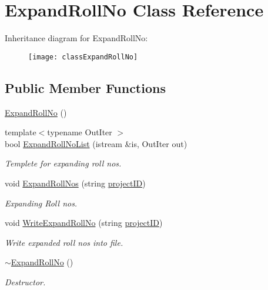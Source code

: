 \hypertarget{classExpandRollNo}{\section{\-Expand\-Roll\-No \-Class \-Reference}
\label{classExpandRollNo}
}
\-Inheritance diagram for \-Expand\-Roll\-No\-:\begin{figure}[H]
\begin{center}
\leavevmode
\texttt{[image: classExpandRollNo]}
\end{center}
\end{figure}
\subsection*{\-Public \-Member \-Functions}
\begin{DoxyCompactItemize}
\item 
\hyperlink{classExpandRollNo_a60e3a3d50ebe826b6d5c3304757812ca}{\-Expand\-Roll\-No} ()
\item 
{\footnotesize template$<$typename Out\-Iter $>$ }\\bool \hyperlink{classExpandRollNo_afcb476d9d9f1fdabd456f3ec84b14184}{\-Expand\-Roll\-No\-List} (istream \&is, \-Out\-Iter out)
\begin{DoxyCompactList}\small\item\em \-Templete for expanding roll nos. \end{DoxyCompactList}\item 
void \hyperlink{classExpandRollNo_a4917831a98da9aa068b2589945b46065}{\-Expand\-Roll\-Nos} (string \hyperlink{classReadInput_a3ad470a25b3e0a29466bf4ff1f7d8e81}{project\-I\-D})
\begin{DoxyCompactList}\small\item\em \-Expanding \-Roll nos. \end{DoxyCompactList}\item 
void \hyperlink{classExpandRollNo_af95bc4c35354c225bdfff5fae7f6b845}{\-Write\-Expand\-Roll\-No} (string \hyperlink{classReadInput_a3ad470a25b3e0a29466bf4ff1f7d8e81}{project\-I\-D})
\begin{DoxyCompactList}\small\item\em \-Write expanded roll nos into file. \end{DoxyCompactList}\item 
\hyperlink{classExpandRollNo_acf3cb7b789bd49a79672cb93dac2ed7c}{$\sim$\-Expand\-Roll\-No} ()
\begin{DoxyCompactList}\small\item\em \-Destructor. \end{DoxyCompactList}\end{DoxyCompactItemize}
